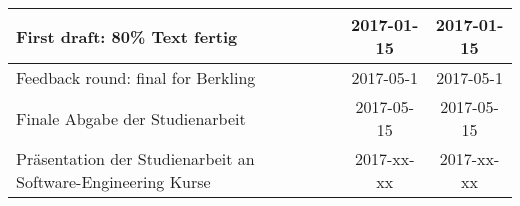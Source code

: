 \begin{table}[]
\begin{tabular}{|p{6cm}|p{3cm}|c|c|}
First draft: 80\% Text fertig                                & \centering{Marc Mahler, Marvin Zerulla}                          & 2017-01-15          & 2017-01-15        \\ \hline
Feedback round: final for Berkling                           & \centering{Marc Mahler, Marvin Zerulla, Prof. PhD. Kay Berkling} & 2017-05-1           & 2017-05-1         \\ \hline
Finale Abgabe der Studienarbeit                              & \centering{Marc Mahler, Marvin Zerulla}                          &  2017-05-15          & 2017-05-15        \\ \hline
Präsentation der Studienarbeit an Software-Engineering Kurse & \centering{Marc Mahler, Marvin Zerulla, Prof. PhD. Kay Berkling} & 2017-xx-xx          & 2017-xx-xx        \\ \hline
\end{tabular}
\end{table}




